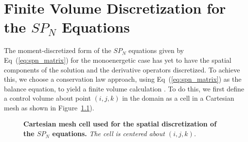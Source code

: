 \chapter{Finite Volume Discretization for the $SP_N$ Equations}
\label{chap:spn_spatial_discretization}
The moment-discretized form of the $SP_N$ equations given by
Eq~(\ref{eq:spn_matrix}) for the monoenergetic case has yet to have
the spatial components of the solution and the derivative operators
discretized. To achieve this, we choose a conservation law approach,
using Eq~(\ref{eq:spn_matrix}) as the balance equation, to yield a
finite volume calculation \citep{leveque_finite_2002}. To do this, we
first define a control volume about point $(i,j,k)$ in the domain as a
cell in a Cartesian mesh as shown in Figure~\ref{fig:mesh_cell}).
\begin{figure}[h!]
  \begin{center}
    \scalebox{1.5}{
     }
  \end{center}
  \caption{\textbf{Cartesian mesh cell used for the spatial
      discretization of the $SP_N$ equations.} \textit{The cell is
      centered about $(i,j,k)$.}}
  \label{fig:mesh_cell}
\end{figure}
